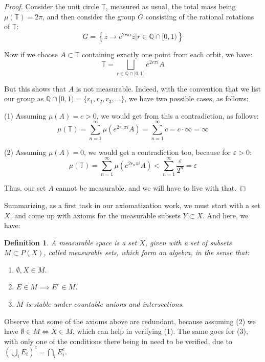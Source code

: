 \documentclass[12pt]{amsbook}
\newtheorem{definition}[theorem]{Definition}
\begin{document}
\begin{proof}
Consider the unit circle $\mathbb T$, measured as usual, the total mass being $\mu(\mathbb T)=2\pi$, and then consider the group $G$ consisting of the rational rotations of $\mathbb T$:
$$G=\left\{z\to e^{2r\pi i}z\Big|r\in\mathbb Q\cap[0,1)\right\}$$

Now if we choose $A\subset\mathbb T$ containing exactly one point from each orbit, we have:
$$\mathbb T=\bigsqcup_{r\in\mathbb Q\cap[0,1)}e^{2r\pi i}A$$  

But this shows that $A$ is not measurable. Indeed, with the convention that we list our group as $\mathbb Q\cap[0,1)=\{r_1,r_2,r_3,\ldots\}$, we have two possible cases, as follows:

\medskip

(1) Assuming $\mu(A)=c>0$, we would get from this a contradiction, as follows:
$$\mu(\mathbb T)=\sum_{n=1}^\infty\mu(e^{2r_n\pi i}A)=\sum_{n=1}^\infty c=c\cdot\infty=\infty$$

(2) Assuming $\mu(A)=0$, we would get a contradiction too, because for $\varepsilon>0$:
$$\mu(\mathbb T)=\sum_{n=1}^\infty\mu(e^{2r_n\pi i}A)<\sum_{n=1}^\infty\frac{\varepsilon}{2^n}=\varepsilon$$

Thus, our set $A$ cannot be measurable, and we will have to live with that.
\end{proof}

Summarizing, as a first task in our axiomatization work, we must start with a set $X$, and come up with axioms for the measurable subsets $Y\subset X$. And here, we have:


\begin{definition}
A measurable space is a set $X$, given with a set of subsets $M\subset P(X)$, called measurable sets, which form an algebra, in the sense that:
\begin{enumerate}
\item $\emptyset,X\in M$.

\item $E\in M\implies E^c\in M$.

\item $M$ is stable under countable unions and intersections.
\end{enumerate}
\end{definition}

Observe that some of the axioms above are redundant, because assuming (2) we have $\emptyset\in M\iff X\in M$, which can help in verifying (1). The same goes for (3), with only one of the conditions there being in need to be verified, due to $\left(\bigcup_iE_i\right)^c=\bigcap_iE_i^c$.
\end{document}
